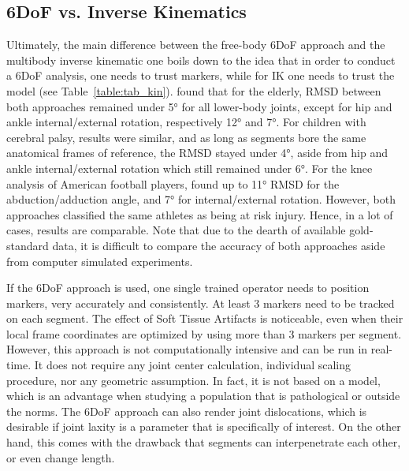 \subsection{6DoF vs. Inverse Kinematics}

Ultimately, the main difference between the free-body 6DoF approach and the multibody inverse kinematic one boils down to the idea that in order to conduct a 6DoF analysis, one needs to trust markers, while for IK one needs to trust the model (see Table~\ref{table:tab_kin}). \cite{Moniz2014} found that for the elderly, RMSD between both approaches remained under 5° for all lower-body joints, except for hip and ankle internal/external rotation, respectively 12° and 7°. For children with cerebral palsy, results were similar, and as long as segments bore the same anatomical frames of reference, the RMSD stayed under 4°, aside from hip and ankle internal/external rotation which still remained under 6°. For the knee analysis of American football players, \cite{Robinson2013} found up to 11° RMSD for the abduction/adduction angle, and 7° for internal/external rotation. However, both approaches classified the same athletes as being at risk injury. Hence, in a lot of cases, results are comparable. Note that due to the dearth of available gold-standard data, it is difficult to compare the accuracy of both approaches aside from computer simulated experiments.

If the 6DoF approach is used, one single trained operator needs to position markers, very accurately and consistently. At least 3 markers need to be tracked on each segment. The effect of Soft Tissue Artifacts is noticeable, even when their local frame coordinates are optimized by using more than 3 markers per segment. However, this approach is not computationally intensive and can be run in real-time. It does not require any joint center calculation, individual scaling procedure, nor any geometric assumption. In fact, it is not based on a model, which is an advantage when studying a population that is pathological or outside the norms. The 6DoF approach can also render joint dislocations, which is desirable if joint laxity is a parameter that is specifically of interest. On the other hand, this comes with the drawback that segments can interpenetrate each other, or even change length.

